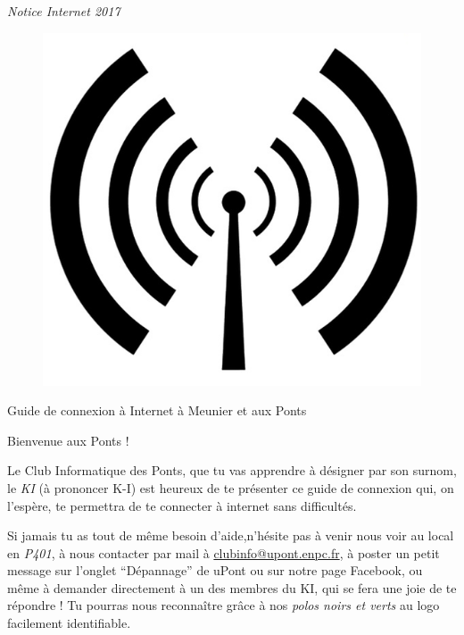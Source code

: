 \documentclass{ki019}
\begin{document}
  \Header{}

  \begin{center}
    {\Huge \emph{Notice Internet 2017}}
  \end{center}

  \begin{figure}[H]
    \centering
    \includegraphics{page1}
  \end{figure}


  \begin{center}
    \Huge{Guide de connexion à Internet à Meunier et aux Ponts}
  \end{center}
  \thispagestyle{empty}
  \Footer


  \newpage


    Bienvenue aux Ponts !

    Le Club Informatique des Ponts, que tu vas apprendre à désigner par son surnom, le \emph{KI} (à prononcer K-I) est heureux de te présenter ce guide de connexion qui, on l'espère, te permettra de te connecter à internet sans difficultés.

    Si jamais tu as tout de même besoin d'aide,n'hésite pas à venir nous voir au local en \emph{P401}, à nous contacter par mail à \href{mailto:clubinfo@upont.enpc.fr}{clubinfo@upont.enpc.fr}, à poster un petit message sur l’onglet “Dépannage” de uPont ou sur notre page Facebook, ou même à demander directement à un des membres du KI, qui se fera une joie de te répondre ! Tu pourras nous reconnaître grâce à nos \emph{polos noirs et verts} au logo facilement identifiable.
\end{document}
